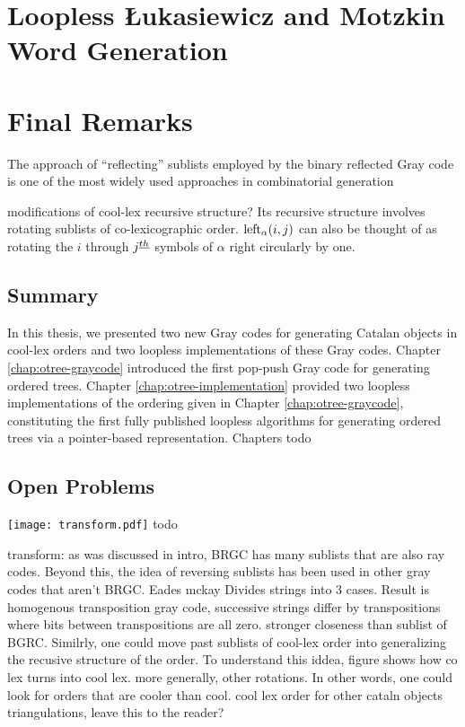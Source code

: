 \chapter{Loopless Łukasiewicz and Motzkin Word Generation} \label{chap:luka-implementation}


\chapter{Final Remarks}
The approach of “reflecting” sublists employed by the binary reflected Gray code is one of the most widely used approaches in combinatorial generation

modifications of cool-lex recursive structure?
Its recursive structure involves rotating sublists of co-lexicographic order.  
$\lshiftindex[\alpha]{i}{j}$ can also be thought of as rotating the $i$ through $j\thh$ symbols of $\alpha$ right circularly by one.
\section{Summary} 

In this thesis, we presented two new Gray codes for generating Catalan objects in cool-lex orders and two loopless implementations of these Gray codes.  Chapter \ref{chap:otree-graycode} introduced the first pop-push Gray code for generating ordered trees.  Chapter \ref{chap:otree-implementation} provided two loopless implementations of the ordering given in Chapter \ref{chap:otree-graycode}, constituting the first fully published loopless algorithms for generating ordered trees via a pointer-based representation.  Chapters 
todo
\section{Open Problems}
\texttt{[image: transform.pdf]}
todo

transform: as was discussed in intro, BRGC has many sublists that are also ray codes.  Beyond this, the idea of reversing sublists has been used in other gray codes that aren't BRGC. Eades mckay Divides strings into 3 cases. Result is homogenous transposition gray code, successive strings differ by transpositions where bits between transpositions are all zero. stronger closeness than sublist of BGRC. Similrly, one could move past sublists of cool-lex order into generalizing the recusive structure of the order. To understand this iddea, figure shows how co lex turns into cool lex.  more generally, other rotations.  In other words, one could look for orders that are cooler than cool. 
cool lex order for other cataln objects
triangulations, leave this to the reader?






